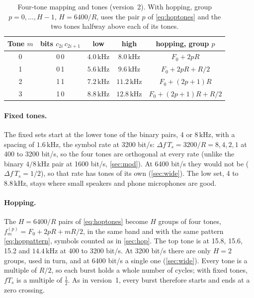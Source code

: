 \documentclass[11pt,a4paper]{article}
\newcommand{\kHz}{\,\mathrm{kHz}}
\theoremstyle{remark}
\begin{document}
\begin{table}[ht]
\centering
\caption{Four-tone mapping and tones (version~2). With hopping, group $p = 0, \dots, H-1$, $H = 6400/R$, uses the pair $p$ of \cref{eq:hoptones} and the two tones halfway above each of its tones.}
\label{tab:gray}
\small
\begin{tabular}{ccccc}
\toprule
Tone $m$ & bits $c_{2i}\,c_{2i+1}$ & low & high & hopping, group $p$\\
\midrule
0 & 0\,0 & $4.0\kHz$ & $8.0\kHz$ & $F_0 + 2pR$\\
1 & 0\,1 & $5.6\kHz$ & $9.6\kHz$ & $F_0 + 2pR + R/2$\\
2 & 1\,1 & $7.2\kHz$ & $11.2\kHz$ & $F_0 + (2p+1)R$\\
3 & 1\,0 & $8.8\kHz$ & $12.8\kHz$ & $F_0 + (2p+1)R + R/2$\\
\bottomrule
\end{tabular}
\end{table}

\paragraph{Fixed tones.}
The fixed sets start at the lower tone of the binary pairs, 4 or $8\kHz$, with a spacing of $1.6\kHz$, the symbol rate at 3200 bit/s: $\Delta f\,T_s = 3200/R = 8, 4, 2, 1$ at 400 to 3200 bit/s, so the four tones are orthogonal at every rate (unlike the binary $4/8\kHz$ pair at 1600 bit/s, \cref{sec:mod}). At 6400 bit/s they would not be ($\Delta f\,T_s = 1/2$), so that rate has tones of its own (\cref{sec:wide}). The low set, 4 to $8.8\kHz$, stays where small speakers and phone microphones are good.

\paragraph{Hopping.}
The $H = 6400/R$ pairs of \cref{eq:hoptones} become $H$ groups of four tones, $f_m^{(p)} = F_0 + 2pR + mR/2$, in the same band and with the same pattern \cref{eq:hoppattern}, symbols counted as in \cref{sec:hop}. The top tone is at 15.8, 15.6, 15.2 and $14.4\kHz$ at 400 to 3200 bit/s. At 3200 bit/s there are only $H = 2$ groups, used in turn, and at 6400 bit/s a single one (\cref{sec:wide}). Every tone is a multiple of $R/2$, so each burst holds a whole number of cycles; with fixed tones, $f T_s$ is a multiple of $\tfrac12$. As in version~1, every burst therefore starts and ends at a zero crossing.
\end{document}
